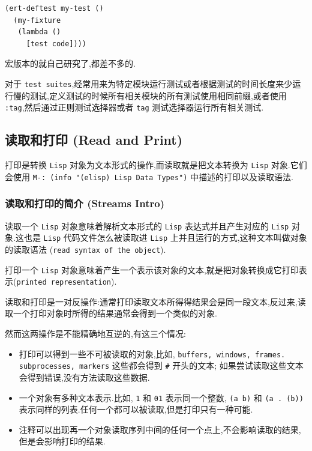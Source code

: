 \documentclass[11pt]{article}
\begin{document}
\begin{enumerate}
\begin{enumerate}
\begin{verbatim}
(ert-deftest my-test ()
  (my-fixture
   (lambda ()
     [test code])))
\end{verbatim}

宏版本的就自己研究了,都差不多的.

对于 \texttt{test suites},经常用来为特定模块运行测试或者根据测试的时间长度来少运行慢的测试,定义测试的时候所有相关模块的所有测试使用相同前缀,或者使用 \texttt{:tag},然后通过正则测试选择器或者 \texttt{tag} 测试选择器运行所有相关测试.
\end{enumerate}
\end{enumerate}



\subsection{读取和打印 (Read and Print)}
\label{sec:org1d26878}

打印是转换 \texttt{Lisp} 对象为文本形式的操作,而读取就是把文本转换为 \texttt{Lisp} 对象.它们会使用 \texttt{M-: (info "(elisp) Lisp Data Types")} 中描述的打印以及读取语法.

\subsubsection{读取和打印的简介 (Streams Intro)}
\label{sec:org1e29bf9}

读取一个 \texttt{Lisp} 对象意味着解析文本形式的 \texttt{Lisp} 表达式并且产生对应的 \texttt{Lisp} 对象.这也是 \texttt{Lisp} 代码文件怎么被读取进 \texttt{Lisp} 上并且运行的方式,这种文本叫做对象的读取语法 (\texttt{read syntax of the object}).

打印一个 \texttt{Lisp} 对象意味着产生一个表示该对象的文本,就是把对象转换成它打印表示(\texttt{printed representation}).

读取和打印是一对反操作:通常打印读取文本所得得结果会是同一段文本,反过来,读取一个打印对象时所得的结果通常会得到一个类似的对象.

然而这两操作是不能精确地互逆的,有这三个情况:

\begin{itemize}
\item 打印可以得到一些不可被读取的对象,比如, \texttt{buffers, windows, frames. subprocesses, markers} 这些都会得到 \texttt{\#} 开头的文本;
如果尝试读取这些文本会得到错误,没有方法读取这些数据.
\item 一个对象有多种文本表示.比如, \texttt{1} 和 \texttt{01} 表示同一个整数, \texttt{(a b)} 和 \texttt{(a . (b))} 表示同样的列表.任何一个都可以被读取,但是打印只有一种可能.
\item 注释可以出现再一个对象读取序列中间的任何一个点上,不会影响读取的结果,但是会影响打印的结果.
\end{itemize}
\end{document}
